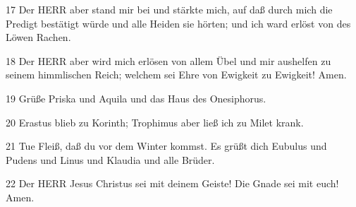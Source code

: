 \par 17 Der HERR aber stand mir bei und stärkte mich, auf daß durch mich die Predigt bestätigt würde und alle Heiden sie hörten; und ich ward erlöst von des Löwen Rachen.
\par 18 Der HERR aber wird mich erlösen von allem Übel und mir aushelfen zu seinem himmlischen Reich; welchem sei Ehre von Ewigkeit zu Ewigkeit! Amen.
\par 19 Grüße Priska und Aquila und das Haus des Onesiphorus.
\par 20 Erastus blieb zu Korinth; Trophimus aber ließ ich zu Milet krank.
\par 21 Tue Fleiß, daß du vor dem Winter kommst. Es grüßt dich Eubulus und Pudens und Linus und Klaudia und alle Brüder.
\par 22 Der HERR Jesus Christus sei mit deinem Geiste! Die Gnade sei mit euch! Amen.

